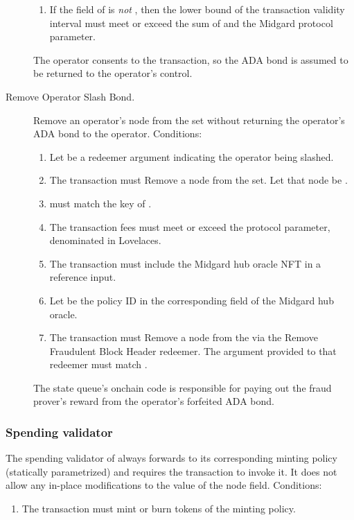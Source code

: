 \documentclass[../midgard.tex]{subfiles}
\begin{document}
\begin{description}
\begin{enumerate}
            \item If the  field of  is \emph{not} , then the lower bound of the transaction validity interval must meet or exceed the sum of  and the Midgard  protocol parameter.
        \end{enumerate}
    The operator consents to the transaction, so the ADA bond is assumed to be returned to the operator's control.
    \item[Remove Operator Slash Bond.] Remove an operator's node from the  set without returning the operator's ADA bond to the operator. Conditions:
        \begin{enumerate}
            \item Let  be a redeemer argument indicating the operator being slashed.
            \item The transaction must Remove a node from the  set. Let that node be .
            \item {} must match the key of .
            \item The transaction fees must meet or exceed the  protocol parameter, denominated in Lovelaces.
            \item The transaction must include the Midgard hub oracle NFT in a reference input. 
            \item Let  be the policy ID in the corresponding field of the Midgard hub oracle.
            \item The transaction must Remove a node from the  via the Remove Fraudulent Block Header redeemer. The  argument provided to that redeemer must match .
        \end{enumerate}

        The state queue's onchain code is responsible for paying out the fraud prover's reward from the operator's forfeited ADA bond.
\end{description}

\subsubsection{Spending validator}
\label{h:retired-operators-spending-validator}

The spending validator of  always forwards to its corresponding minting policy (statically parametrized) and requires the transaction to invoke it. It does not allow any in-place modifications to the  value of the node  field. Conditions:
\begin{enumerate}
    \item The transaction must mint or burn tokens of the  minting policy.
\end{enumerate}
\end{document}
